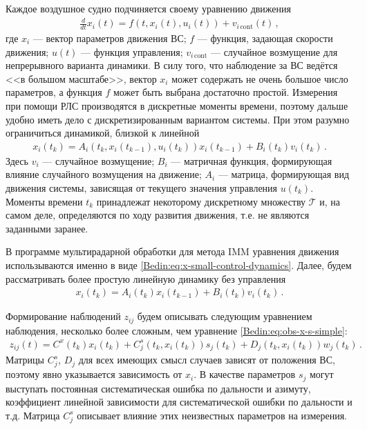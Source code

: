 Каждое воздушное судно подчиняется своему уравнению движения 
\begin{gather*}
  \frac{d}{dt} x_i(t) = f(t, x_i(t), u_i(t)) + v_{i \, \mathrm{cont}}(t)\,, 
\end{gather*}
где $x_i$ --- вектор параметров движения ВС; 
$f$ --- функция, задающая скорости движения; 
$u(t)$ --- функция управления; 
$v_{i\,\mathrm{cont}}$ --- случайное возмущение для непрерывного варианта динамики. 
В силу того, что наблюдение за ВС ведётся <<в большом масштабе>>, 
вектор $x_i$ может содержать не очень большое число параметров, 
а функция $f$ может быть выбрана достаточно простой. 
Измерения при помощи РЛС производятся в дискретные моменты времени, 
поэтому дальше удобно иметь дело с дискретизированным вариантом системы. 
При этом разумно ограничиться динамикой, близкой к линейной 
\begin{gather}
  x_i(t_k) = A_i(t_k, x_i(t_{k - 1}), u_i(t_k)) x_i(t_{k - 1}) + B_i(t_k) v_i(t_k) \,. 
  \label{Bedin:eq:x-small-control-dynamics}
\end{gather}
Здесь $v_i$ --- случайное возмущение; 
$B_i$ --- матричная функция, формирующая влияние случайного возмущения на движение; 
$A_i$ --- матрица, формирующая вид движения системы, зависящая от текущего значения управления $u(t_k)$. 
Моменты времени $t_k$ принадлежат некоторому дискретному множеству $\mathcal{T}$ 
и, на самом деле, определяются по ходу развития движения, т.е. не являются заданными заранее. 

В программе мультирадарной обработки для метода IMM уравнения движения использываются именно в виде 
\eqref{Bedin:eq:x-small-control-dynamics}. 
Далее, будем рассматривать более простую линейную динамику без управления 
\begin{gather}
  x_i(t_k) = A_i(t_k) x_i(t_{k - 1}) + B_i(t_k) v_i(t_k) \,. 
  \label{Bedin:eq:x-small-dynamics}
\end{gather}

Формирование наблюдений $z_{i j}$ будем описывать следующим уравнением наблюдения, 
несколько более сложным, чем уравнение \eqref{Bedin:eq:obs-x-s-simple}: 
\begin{gather}
  z_{i j}(t) = C^x(t_k) x_i(t_k) + C^s_j(t_k, x_i(t_k)) s_j(t_k) + D_j(t_k, x_i(t_k)) w_j(t_k) \,. 
  \label{Bedin:eq:obs-x-s-simple}
\end{gather}
Матрицы $C^s_j$, $D_j$ для всех имеющих смысл случаев зависят от положения ВС, 
поэтому явно указывается зависимость от $x_i$. 
В качестве параметров $s_j$ могут выступать постоянная систематическая ошибка по дальности 
и азимуту, коэффициент линейной зависимости для систематической ошибки по дальности и т.д. 
Матрица $C^s_j$ описывает влияние этих неизвестных параметров на измерения. 

